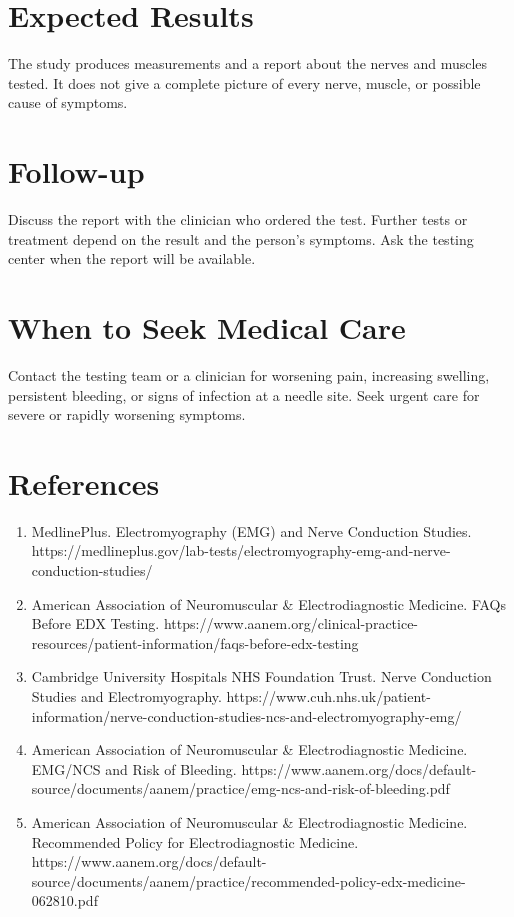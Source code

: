 \section*{Expected Results}
The study produces measurements and a report about the nerves and muscles tested. It does not give a complete picture of every nerve, muscle, or possible cause of symptoms.

\section*{Follow-up}
Discuss the report with the clinician who ordered the test. Further tests or treatment depend on the result and the person's symptoms. Ask the testing center when the report will be available.

\section*{When to Seek Medical Care}
Contact the testing team or a clinician for worsening pain, increasing swelling, persistent bleeding, or signs of infection at a needle site. Seek urgent care for severe or rapidly worsening symptoms.

\section*{References}
\begin{enumerate}
  \item MedlinePlus. Electromyography (EMG) and Nerve Conduction Studies. https://medlineplus.gov/lab-tests/electromyography-emg-and-nerve-conduction-studies/
  \item American Association of Neuromuscular \& Electrodiagnostic Medicine. FAQs Before EDX Testing. https://www.aanem.org/clinical-practice-resources/patient-information/faqs-before-edx-testing
  \item Cambridge University Hospitals NHS Foundation Trust. Nerve Conduction Studies and Electromyography. https://www.cuh.nhs.uk/patient-information/nerve-conduction-studies-ncs-and-electromyography-emg/
  \item American Association of Neuromuscular \& Electrodiagnostic Medicine. EMG/NCS and Risk of Bleeding. https://www.aanem.org/docs/default-source/documents/aanem/practice/emg-ncs-and-risk-of-bleeding.pdf
  \item American Association of Neuromuscular \& Electrodiagnostic Medicine. Recommended Policy for Electrodiagnostic Medicine. https://www.aanem.org/docs/default-source/documents/aanem/practice/recommended-policy-edx-medicine-062810.pdf
\end{enumerate}

\clearpage
